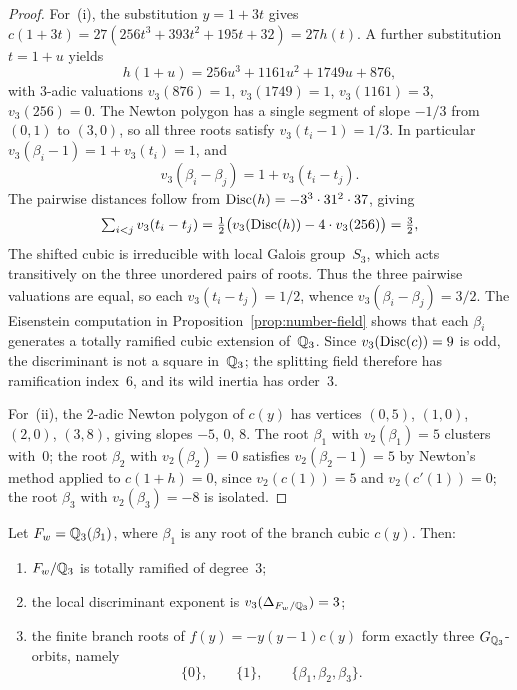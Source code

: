 \begin{proof}
For~(i), the substitution \(y=1+3t\) gives \(c(1+3t)=27(256t^3+393t^2+195t+32)=27h(t)\). A further substitution \(t=1+u\) yields
\[
h(1+u)=256u^3+1161u^2+1749u+876,
\]
with \(3\)-adic valuations \(v_3(876)=1\), \(v_3(1749)=1\), \(v_3(1161)=3\), \(v_3(256)=0\). The Newton polygon has a single segment of slope \(-1/3\) from \((0,1)\) to \((3,0)\), so all three roots satisfy \(v_3(t_i-1)=1/3\). In particular \(v_3(\beta_i-1)=1+v_3(t_i)=1\), and
\[
v_3(\beta_i-\beta_j)=1+v_3(t_i-t_j).
\]
The pairwise distances follow from \(\operatorname{Disc}(h)=-3^3\cdot 31^2\cdot 37\), giving
\[
\textstyle\sum_{i<j}v_3(t_i-t_j)=\tfrac12\bigl(v_3(\operatorname{Disc}(h))-4\cdot v_3(256)\bigr)=\tfrac32,
\]
The shifted cubic is irreducible with local Galois group~\(S_3\), which acts transitively on the three unordered pairs of roots. Thus the three pairwise valuations are equal, so each \(v_3(t_i-t_j)=1/2\), whence \(v_3(\beta_i-\beta_j)=3/2\). The Eisenstein computation in Proposition~\ref{prop:number-field} shows that each \(\beta_i\) generates a totally ramified cubic extension of~\(\mathbb{Q}_3\). Since \(v_3(\operatorname{Disc}(c))=9\) is odd, the discriminant is not a square in~\(\mathbb{Q}_3\); the splitting field therefore has ramification index~\(6\), and its wild inertia has order~\(3\).

For~(ii), the \(2\)-adic Newton polygon of \(c(y)\) has vertices \((0,5)\), \((1,0)\), \((2,0)\), \((3,8)\), giving slopes \(-5\), \(0\), \(8\). The root \(\beta_1\) with \(v_2(\beta_1)=5\) clusters with~\(0\); the root \(\beta_2\) with \(v_2(\beta_2)=0\) satisfies \(v_2(\beta_2-1)=5\) by Newton's method applied to \(c(1+h)=0\), since \(v_2(c(1))=5\) and \(v_2(c'(1))=0\); the root \(\beta_3\) with \(v_2(\beta_3)=-8\) is isolated.
\end{proof}

\begin{proposition}\label{lem:local-three-prep}
Let \(F_w=\mathbb{Q}_3(\beta_1)\), where \(\beta_1\) is any root of the branch cubic \(c(y)\). Then:
\begin{enumerate}
\item[(i)] \(F_w/\mathbb{Q}_3\) is totally ramified of degree~\(3\);
\item[(ii)] the local discriminant exponent is \(v_3(\Delta_{F_w/\mathbb{Q}_3})=3\);
\item[(iii)] the finite branch roots of \(f(y)=-y(y-1)c(y)\) form exactly three \(G_{\mathbb{Q}_3}\)-orbits, namely
\[
\{0\},\qquad \{1\},\qquad \{\beta_1,\beta_2,\beta_3\}.
\]
\end{enumerate}
\end{proposition}

